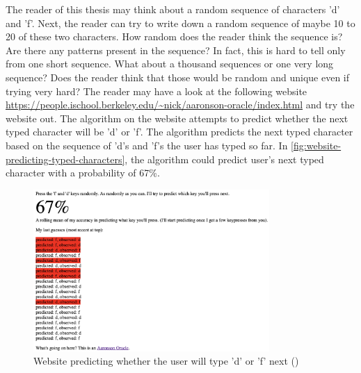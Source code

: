 \documentclass{BachelorBUI}
\begin{document}
        The reader of this thesis may think about a random sequence of characters 'd' and 'f'. Next, the reader can try to write down a random sequence of maybe 10 to 20 of these two characters. How random does the reader think the sequence is? Are there any patterns present in the sequence? In fact, this is hard to tell only from one short sequence. What about a thousand sequences or one very long sequence? Does the reader think that those would be random and unique even if trying very hard? The reader may have a look at the following website \url{https://people.ischool.berkeley.edu/~nick/aaronson-oracle/index.html} and try the website out. The algorithm on the website attempts to predict whether the next typed character will be 'd' or 'f'. The algorithm predicts the next typed character based on the sequence of 'd's and 'f's the user has typed so far. In \autoref{fig:website-predicting-typed-characters}, the algorithm could predict user's next typed character with a probability of 67\%.

        \begin{figure}[h]
            \centering
            \includegraphics[width=0.8\textwidth]{website_predicting_typed_characters.png}
            \caption{\centering Website predicting whether the user will type 'd' or 'f' next (\cite{website_predicting_typed_characters:2024})}
            \label{fig:website-predicting-typed-characters}
        \end{figure}
\end{document}
